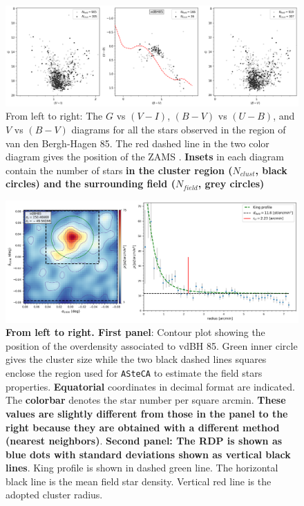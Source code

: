 \documentclass[referee]{aa}
\begin{document}
\begin{figure}[ht]
    \centering
    \includegraphics[width=\hsize]{../figs/obs_vdBH85.png}
\caption{From left to right: The $G$ vs $(V-I)$, $(B-V)$ vs $(U-B)$, and
$V$ vs $(B-V)$ diagrams for all the stars observed in the region of van
den Bergh-Hagen 85.
The red dashed line in the two color diagram gives the position of the ZAMS
\citep{Aller1982}. \textbf{Insets} in each diagram contain the number of stars 
\textbf{in the cluster region ($N_{clust}$, black circles) and the surrounding
field ($N_{field}$, grey circles)}
}
    \label{fig:photom_vdBH85} %
\end{figure}

\begin{figure}[ht]
    \centering
    \includegraphics[width=\hsize]{../figs/dmap_vdbh85.png}
\caption{\textbf{From left to right. First panel}:
Contour plot showing the position of the overdensity associated to vdBH 85.
Green inner circle gives the cluster size while the two black dashed lines
squares enclose the region used for \texttt{ASteCA} to estimate the field stars
properties. \textbf{Equatorial} coordinates in decimal format are indicated.
The \textbf{colorbar} denotes the star number per square arcmin. \textbf{These
values are slightly different from those in the panel to the right because
they are obtained with a different method (nearest neighbors)}.
%
\textbf{Second panel: The RDP is shown as blue dots with
standard deviations shown as vertical black lines}. King profile is
shown in dashed green line. The horizontal black line is the mean field
star density. Vertical red line is the adopted cluster radius.
}
    \label{fig:struct_vdBH85}
\end{figure}
\end{document}
